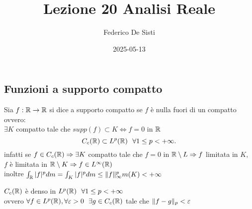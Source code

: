 \documentclass[12px]{article}
\title{Lezione 20 Analisi Reale}
\date{2025-05-13}
\author{Federico De Sisti}
\begin{document}
	\maketitle
	\newpage
	\subsection{Funzioni a supporto compatto}
	\begin{defi}
	Sia $f: \mathbb{R} \rightarrow \mathbb{R}$ si dice a  supporto compatto se $f$ è nulla fuori di un compatto\\
	ovvero:\\
	$\exists K$ compatto tale che  $supp(f)\subset K \Leftrightarrow f=0 $ in $\mathbb{R}$
	 \[
	C_c(\mathbb{R})\subset L^p(\mathbb{R}) \ \ \forall 1\leq p < +\infty
	.\] 
infatti se $f\in C_c(\mathbb{R}) \Rightarrow  \exists K$ compatto tale che $f =0 $ in  $\mathbb{R}\setminus L \Rightarrow  f$  limitata in $K, $  $f$ è limitata in $\mathbb{R}\setminus K \Rightarrow  f\in L^\infty(\mathbb{R})$ \\
inoltre $\int_{\mathbb{R}}|f|^p d m = \int_K|f|^pd m\leq \|f\|_\infty^p m(K) < +\infty $
	\end{defi}
	\begin{teo}
		$C_c(\mathbb{R})$ è denso in  $L^p(\mathbb{R})\ \ \forall 1\leq p < +\infty$ \\
		ovvero  $\forall f\in L^p(\mathbb{R}), \forall \varepsilon> 0 \ \ \exists g\in C_c(\mathbb{R})$ tale che  $\|f-g\|_p< \varepsilon$
	\end{teo}
\end{document}
